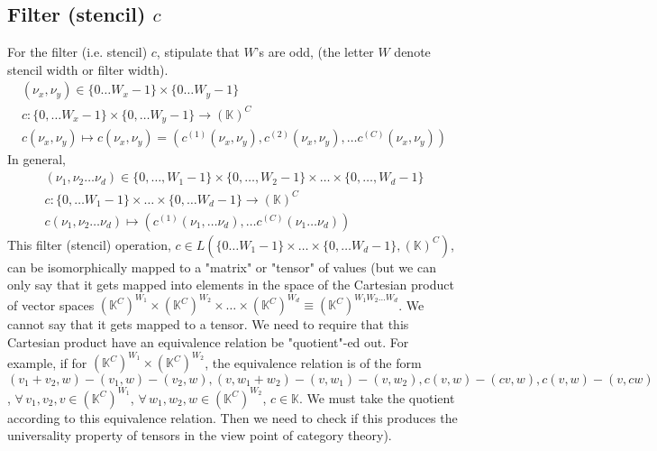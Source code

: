 \documentclass[10pt]{amsart}
\begin{document}
\begin{multicols*}{2}
\subsection{Filter (stencil) $c$ }
For the filter (i.e. stencil) $c$, stipulate that $W$'s are odd, (the letter $W$ denote stencil width or filter width).  
\[
\begin{gathered}
	(\nu_x,\nu_y) \in \lbrace 0 \dots W_x-1\rbrace \times \lbrace 0 \dots W_y-1 \rbrace \\
	c : \lbrace 0 , \dots W_x -1\rbrace \times \lbrace 0, \dots W_y-1 \rbrace \to (\mathbb{K})^C  \\
	c(\nu_x,\nu_y) \mapsto c(\nu_x,\nu_y)=(c^{(1)}(\nu_x,\nu_y),c^{(2)}(\nu_x,\nu_y), \dots c^{(C)}(\nu_x,\nu_y)) 
\end{gathered}
\]
In general, 
\begin{equation}
\begin{gathered}
	(\nu_1, \nu_2 \dots \nu_d) \in \lbrace 0 , \dots , W_1-1 \rbrace \times \lbrace 0 , \dots , W_2-1 \rbrace \times \dots \times \lbrace 0 , \dots , W_d-1 \rbrace   \\
	c: \lbrace 0 , \dots W_1 - 1 \rbrace \times \dots \times \lbrace 0 , \dots W_d - 1 \rbrace \to (\mathbb{K})^C  \\
	c(\nu_1 , \nu_2 \dots \nu_d) \mapsto (c^{(1)}(\nu_1 , \dots \nu_d) ,\dots c^{(C)}(\nu_1 \dots \nu_d) )
\end{gathered}
\end{equation}
This filter (stencil) operation, $c\in L(\lbrace 0 \dots W_1 - 1\rbrace \times \dots \times \lbrace 0 ,\dots W_d - 1\rbrace , (\mathbb{K})^C)$, can be isomorphically mapped to a "matrix" or "tensor" of values (but we can only say that it gets mapped into elements in the space of the Cartesian product of vector spaces $(\mathbb{K}^C)^{W_1} \times (\mathbb{K}^C)^{W_2} \times \dots \times (\mathbb{K}^C)^{W_d} \equiv (\mathbb{K}^C)^{W_1 W_2 \dots W_d}$.  We cannot say that it gets mapped to a tensor.  We need to require that this Cartesian product have an equivalence relation be "quotient"-ed out.  For example, if for $(\mathbb{K}^C)^{W_1} \times (\mathbb{K}^C)^{W_2}$, the equivalence relation is of the form $(v_1 + v_2,w) - (v_1,w) - (v_2,w), (v,w_1+w_2)-(v,w_1)-(v,w_2), c(v,w)-(cv,w), c(v,w)-(v,cw)$, $\forall \, v_1,v_2,v \in (\mathbb{K}^C)^{W_1}$, $\forall \, w_1,w_2,w \in (\mathbb{K}^C)^{W_2}$, $c\in \mathbb{K}$.  We must take the quotient according to this equivalence relation.  Then we need to check if this produces the universality property of tensors in the view point of category theory).  

\end{multicols*}
\end{document}
